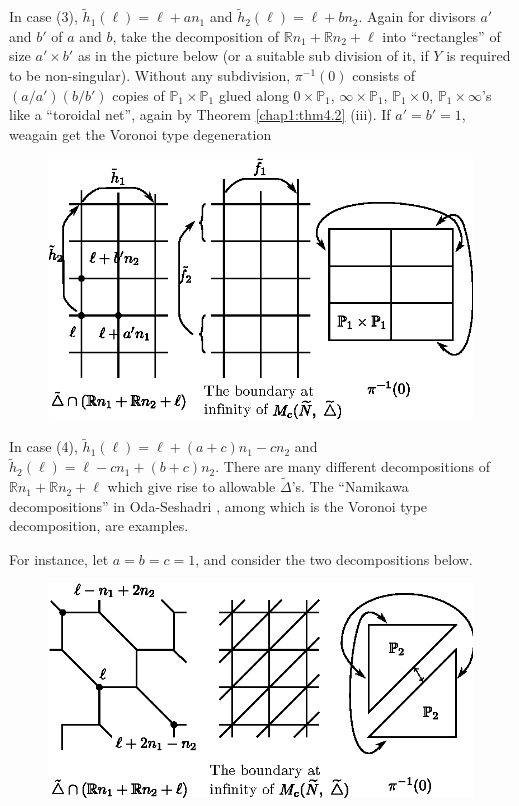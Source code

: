 In case (3), $\tilde{h}_1(\ell)= \ell + an_1$ and
 $\tilde{h}_2 (\ell)= \ell+ bn_2$.  Again for divisors $a'$ and $b'$
 of $a$ and $b$, take the decomposition of $\mathbb{R}n_1+
 \mathbb{R}n_2 + \ell$ into ``rectangles'' of size $a' \times b'$ as in the
 picture below (or a suitable sub division of it, if $Y$ is required to
 be non-singular). Without any subdivision, $\pi^{-1}(0)$ consists of
 $(a/a')(b/b')$ copies of $\mathbb{P}_1 \times \mathbb{P}_1$ glued along $0
 \times \mathbb{P}_1$, $\infty \times \mathbb{P}_1$, $\mathbb{P}_1 \times 0$,
 $\mathbb{P}_1 \times \infty$'s like a ``toroidal net'', again by Theorem
\ref{chap1:thm4.2} (iii). If  $a'= b' =1$, we\pageoriginale again get the Voronoi
type degeneration   
\begin{figure}[H]
\centering 
\includegraphics{vol58-fig/fig58-63.eps} 
\end{figure}
  
 In case (4), $\tilde{h}_1(\ell)= \ell +(a+c)n_1 - cn_2$ and
 $\tilde{h}_2(\ell)= \ell- cn_1 +(b+c)n_2$. There are many different
 decompositions of $\mathbb{R}n_1+\mathbb{R}n_2+ \ell$ which give rise
 to allowable $\tilde{\Delta}$'s. The ``Namikawa decompositions'' in
 Oda-Seshadri \cite{keyOS}, among which is the Voronoi type decomposition,
 are examples.  
 
 For instance, let $a= b = c = 1$, and consider the two decompositions
 below. 
 \begin{figure}[H]
\centering 
\includegraphics{vol58-fig/fig58-64.eps} 
\end{figure}
 
